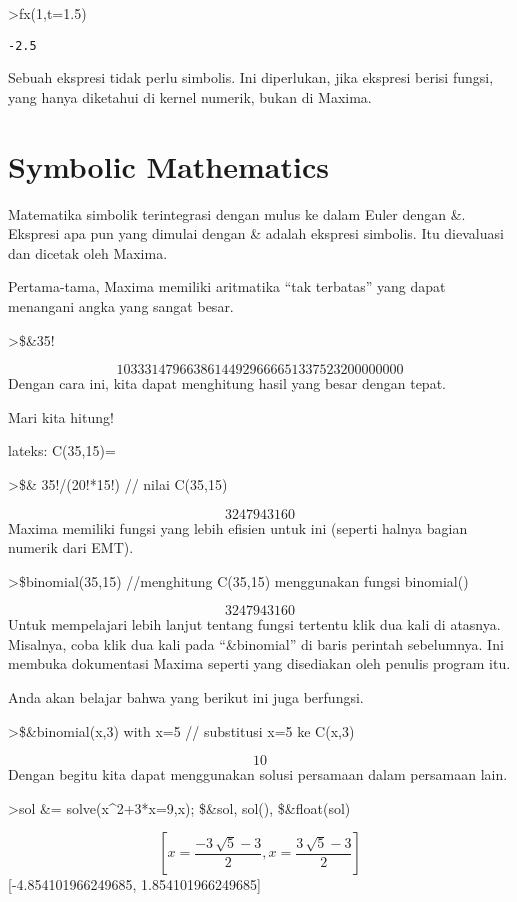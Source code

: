 \documentclass[
]{book}
\begin{document}
\textgreater fx(1,t=1.5)

\begin{verbatim}
-2.5
\end{verbatim}

Sebuah ekspresi tidak perlu simbolis. Ini diperlukan, jika ekspresi berisi fungsi, yang hanya diketahui di kernel numerik, bukan di Maxima.

\section{Symbolic Mathematics}\label{symbolic-mathematics}

Matematika simbolik terintegrasi dengan mulus ke dalam Euler dengan \&. Ekspresi apa pun yang dimulai dengan \& adalah ekspresi simbolis. Itu dievaluasi dan dicetak oleh Maxima.

Pertama-tama, Maxima memiliki aritmatika ``tak terbatas'' yang dapat menangani angka yang sangat besar.

\textgreater\$\&35!

\[10333147966386144929666651337523200000000\]Dengan cara ini, kita dapat menghitung hasil yang besar dengan tepat.

Mari kita hitung!

lateks: C(35,15)=

\textgreater\$\& 35!/(20!*15!) // nilai C(35,15)

\[3247943160\]Maxima memiliki fungsi yang lebih efisien untuk ini (seperti halnya bagian numerik dari EMT).

\textgreater\$binomial(35,15) //menghitung C(35,15) menggunakan fungsi binomial()

\[3247943160\]Untuk mempelajari lebih lanjut tentang fungsi tertentu klik dua kali di atasnya. Misalnya, coba klik dua kali pada ``\&binomial'' di baris perintah sebelumnya. Ini membuka dokumentasi Maxima seperti yang disediakan oleh penulis program itu.

Anda akan belajar bahwa yang berikut ini juga berfungsi.

\textgreater\$\&binomial(x,3) with x=5 // substitusi x=5 ke C(x,3)

\[10\]Dengan begitu kita dapat menggunakan solusi persamaan dalam persamaan lain.

\textgreater sol \&= solve(x\^{}2+3*x=9,x); \$\&sol, sol(), \$\&float(sol)

\[\left[ x=\frac{-3\,\sqrt{5}-3}{2} , x=\frac{3\,\sqrt{5}-3}{2}
  \right] \] {[}-4.854101966249685, 1.854101966249685{]}
\end{document}
